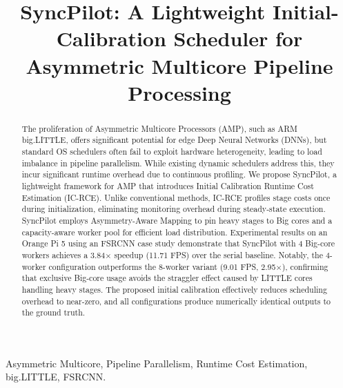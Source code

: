 \documentclass[conference]{IEEEtran}
\begin{document}
\title{SyncPilot: A Lightweight Initial-Calibration Scheduler for Asymmetric Multicore Pipeline Processing
}

\author{


}
\maketitle

\begin{abstract}
The proliferation of Asymmetric Multicore Processors (AMP), such as ARM big.LITTLE, offers significant potential for edge Deep Neural Networks (DNNs), but standard OS schedulers often fail to exploit hardware heterogeneity, leading to load imbalance in pipeline parallelism. While existing dynamic schedulers address this, they incur significant runtime overhead due to continuous profiling. We propose SyncPilot, a lightweight framework for AMP that introduces Initial Calibration Runtime Cost Estimation (IC-RCE). Unlike conventional methods, IC-RCE profiles stage costs once during initialization, eliminating monitoring overhead during steady-state execution. SyncPilot employs Asymmetry-Aware Mapping to pin heavy stages to Big cores and a capacity-aware worker pool for efficient load distribution. Experimental results on an Orange Pi 5 using an FSRCNN case study demonstrate that SyncPilot with 4 Big-core workers achieves a 3.84$\times$ speedup (11.71 FPS) over the serial baseline. Notably, the 4-worker configuration outperforms the 8-worker variant (9.01 FPS, 2.95$\times$), confirming that exclusive Big-core usage avoids the straggler effect caused by LITTLE cores handling heavy stages. The proposed initial calibration effectively reduces scheduling overhead to near-zero, and all configurations produce numerically identical outputs to the ground truth.
\end{abstract}

\begin{IEEEkeywords}
Asymmetric Multicore, Pipeline Parallelism, Runtime Cost Estimation, big.LITTLE, FSRCNN.
\end{IEEEkeywords}
\end{document}
